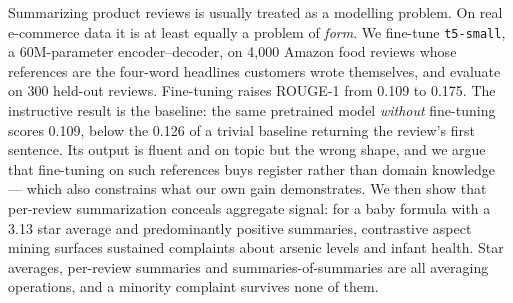 Summarizing product reviews is usually treated as a modelling problem. On real
e-commerce data it is at least equally a problem of \emph{form}. We fine-tune
\texttt{t5-small}, a 60M-parameter encoder--decoder, on 4{,}000 Amazon food
reviews whose references are the four-word headlines customers wrote
themselves, and evaluate on 300 held-out reviews. Fine-tuning raises ROUGE-1
from 0.109 to 0.175. The instructive result is the baseline: the same
pretrained model \emph{without} fine-tuning scores 0.109, below the 0.126 of a
trivial baseline returning the review's first sentence. Its output is fluent
and on topic but the wrong shape, and we argue that fine-tuning on such
references buys register rather than domain knowledge --- which also constrains
what our own gain demonstrates. We then show that per-review summarization
conceals aggregate signal: for a baby formula with a 3.13 star average and
predominantly positive summaries, contrastive aspect mining surfaces sustained
complaints about arsenic levels and infant health. Star averages, per-review
summaries and summaries-of-summaries are all averaging operations, and a
minority complaint survives none of them.
